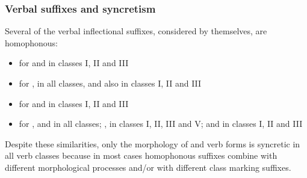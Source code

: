 \subsubsection{Verbal suffixes and syncretism}\label{verbalSuffixesSyncretism}
Several of the verbal inflectional suffixes, considered by themselves, are homophonous: %
\begin{itemize}
\item{ for  and  in classes I, II and III}
\item{ for ,  in all classes, and also  in classes I, II and III}
\item{ for  and  in classes I, II and III}
\item{ for ,  and  in all classes; ,  in classes I, II, III and V; and  in classes I, II and III}
\end{itemize}

Despite these similarities, only the morphology of  and  verb forms is syncretic in all verb classes 
because in most cases homophonous suffixes combine with different morphological processes and/or with different class marking suffixes. 



